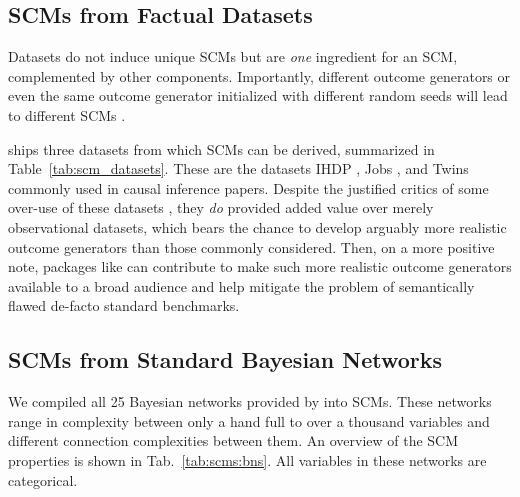 \subsection{SCMs from Factual Datasets}
Datasets do not induce unique SCMs but are \emph{one} ingredient for an SCM, complemented by other components.
Importantly, different outcome generators or even the same outcome generator initialized with different random seeds will lead to different SCMs \citep{curth2021really}.

\package ships three datasets from which SCMs can be derived, summarized in Table~\ref{tab:scm_datasets}.
These are the datasets IHDP \citep{hill2011bayesian}, Jobs \citep{lalonde1986evaluating}, and Twins \citep{almond2005costs} commonly used in causal inference papers.
Despite the justified critics of some over-use of these datasets \citep{curth2021really}, they \emph{do} provided added value over merely observational datasets, which bears the chance to develop arguably more realistic outcome generators than those commonly considered.
Then, on a more positive note, packages like \package can contribute to make such more realistic outcome generators available to a broad audience and help mitigate the problem of semantically flawed de-facto standard benchmarks.

\begin{table}[h!]
    \centering
    \resizebox{\textwidth}{!}{
        
    }
    \caption{Properties of the three datasets shipped with \package to derive SCMs from data.}
    \label{tab:scm_datasets}
\end{table}

\subsection{SCMs from Standard Bayesian Networks}
We compiled all 25 Bayesian networks provided by \cite{scutari_bnrepository} into SCMs.
These networks range in complexity between only a hand full to over a thousand variables and different connection complexities between them.
An overview of the SCM properties is shown in Tab.~\ref{tab:scms:bns}.
All variables in these networks are categorical.

\begin{table}[h!]
    \centering
    \resizebox{\textwidth}{!}{
        
    }
    \caption{Properties of the SCMs derived from fully discrete Bayesian networks.}
    \label{tab:scms:bns}
\end{table}


